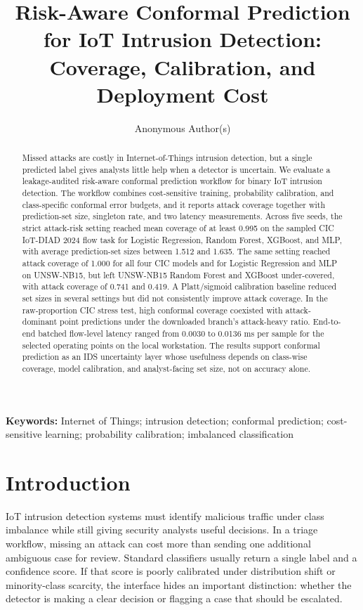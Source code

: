 \documentclass[11pt]{article}
\title{Risk-Aware Conformal Prediction for IoT Intrusion Detection: Coverage, Calibration, and Deployment Cost}
\author{Anonymous Author(s)}
\date{}
\begin{document}
\doublespacing
\linenumbers
\maketitle

\begin{abstract}
Missed attacks are costly in Internet-of-Things intrusion detection, but a single predicted label gives analysts little help when a detector is uncertain. We evaluate a leakage-audited risk-aware conformal prediction workflow for binary IoT intrusion detection. The workflow combines cost-sensitive training, probability calibration, and class-specific conformal error budgets, and it reports attack coverage together with prediction-set size, singleton rate, and two latency measurements. Across five seeds, the strict attack-risk setting reached mean coverage of at least 0.995 on the sampled CIC IoT-DIAD 2024 flow task for Logistic Regression, Random Forest, XGBoost, and MLP, with average prediction-set sizes between 1.512 and 1.635. The same setting reached attack coverage of 1.000 for all four CIC models and for Logistic Regression and MLP on UNSW-NB15, but left UNSW-NB15 Random Forest and XGBoost under-covered, with attack coverage of 0.741 and 0.419. A Platt/sigmoid calibration baseline reduced set sizes in several settings but did not consistently improve attack coverage. In the raw-proportion CIC stress test, high conformal coverage coexisted with attack-dominant point predictions under the downloaded branch's attack-heavy ratio. End-to-end batched flow-level latency ranged from 0.0030 to 0.0136 ms per sample for the selected operating points on the local workstation. The results support conformal prediction as an IDS uncertainty layer whose usefulness depends on class-wise coverage, model calibration, and analyst-facing set size, not on accuracy alone.
\end{abstract}

\noindent\textbf{Keywords:} Internet of Things; intrusion detection; conformal prediction; cost-sensitive learning; probability calibration; imbalanced classification

\section{Introduction}

IoT intrusion detection systems must identify malicious traffic under class imbalance while still giving security analysts useful decisions. In a triage workflow, missing an attack can cost more than sending one additional ambiguous case for review. Standard classifiers usually return a single label and a confidence score. If that score is poorly calibrated under distribution shift or minority-class scarcity, the interface hides an important distinction: whether the detector is making a clear decision or flagging a case that should be escalated.
\end{document}
